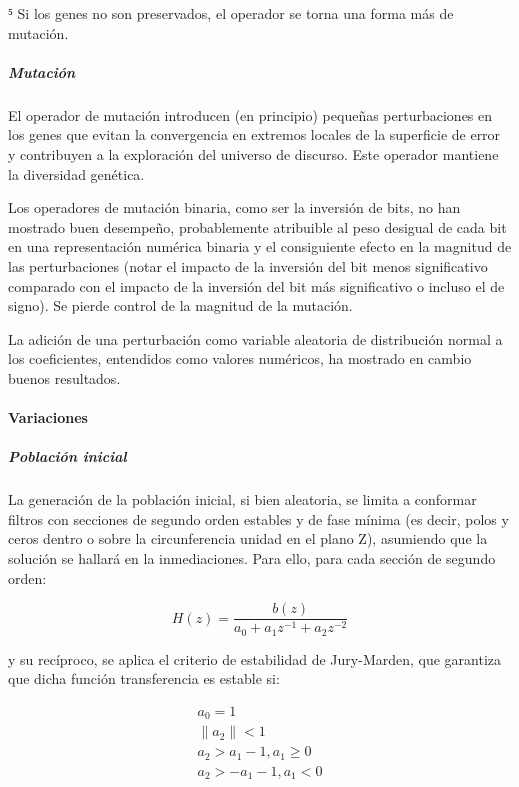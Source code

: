 \documentclass[11pt]{article}
\begin{document}
⁵ Si los genes no son preservados, el operador se torna una forma más de
mutación.

\subparagraph{Mutación}\label{mutaciuxf3n}

El operador de mutación introducen (en principio) pequeñas
perturbaciones en los genes que evitan la convergencia en extremos
locales de la superficie de error y contribuyen a la exploración del
universo de discurso. Este operador mantiene la diversidad genética.

Los operadores de mutación binaria, como ser la inversión de bits, no
han mostrado buen desempeño, probablemente atribuible al peso desigual
de cada bit en una representación numérica binaria y el consiguiente
efecto en la magnitud de las perturbaciones (notar el impacto de la
inversión del bit menos significativo comparado con el impacto de la
inversión del bit más significativo o incluso el de signo). Se pierde
control de la magnitud de la mutación.

La adición de una perturbación como variable aleatoria de distribución
normal a los coeficientes, entendidos como valores numéricos, ha
mostrado en cambio buenos resultados.

\paragraph{Variaciones}\label{variaciones}

\subparagraph{Población inicial}\label{poblaciuxf3n-inicial}

La generación de la población inicial, si bien aleatoria, se limita a
conformar filtros con secciones de segundo orden estables y de fase
mínima (es decir, polos y ceros dentro o sobre la circunferencia unidad
en el plano Z), asumiendo que la solución se hallará en la
inmediaciones. Para ello, para cada sección de segundo orden:


\begin{equation}
H(z) = \frac{b(z)}{a_0 + a_1 z^{-1} + a_2 z^{-2}}
\end{equation}


y su recíproco, se aplica el criterio de estabilidad de Jury-Marden, que
garantiza que dicha función transferencia es estable si:


\begin{gather*}
a_0 = 1 \\
\|a_2\| < 1 \\
a_2 > a_1 - 1, a_1 \geq 0 \\
a_2 > -a_1 - 1, a_1 < 0
\end{gather*}
\end{document}

